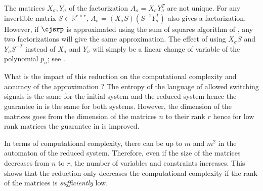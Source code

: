 \begin{myrem}
  The matrices $X_\sigma, Y_\sigma$ of the factorization $A_\sigma = X_\sigma Y_\sigma^T$ are not unique.
  For any invertible matrix $S \in \mathbb{R}^{r \times r}$, $A_\sigma = (X_\sigma S)(S^{-1}Y_\sigma^T)$ also gives a factorization.
  However, if $\cjsrp$ is approximated using the sum of squares algorithm of ,
  any two factorizations will give the same approximation.
  The effect of using $X_\sigma S$ and $Y_\sigma S^{-T}$ instead of $X_\sigma$ and $Y_\sigma$ will simply be a linear change of variable of the polynomial $p_\sigma$;
  see .

\end{myrem}

What is the impact of this reduction on the computational complexity and accuracy of the approximation ?
The entropy of the language of allowed switching signals is the same for the initial system and the reduced system hence the guarantee in  is the same for both systems.
However, the dimension of the matrices goes from the dimension of the matrices $n$ to their rank $r$
hence for low rank matrices the guarantee in  is improved.

In terms of computational complexity, there can be up to $m$ \nodes{} and $m^2$ \arcs{} in the automaton of the reduced system.
Therefore, even if the size of the matrices decreases from $n$ to $r$, the number of variables and constraints increases.
This shows that the reduction only decreases the computational complexity if the rank of the matrices is \emph{sufficiently} low.
